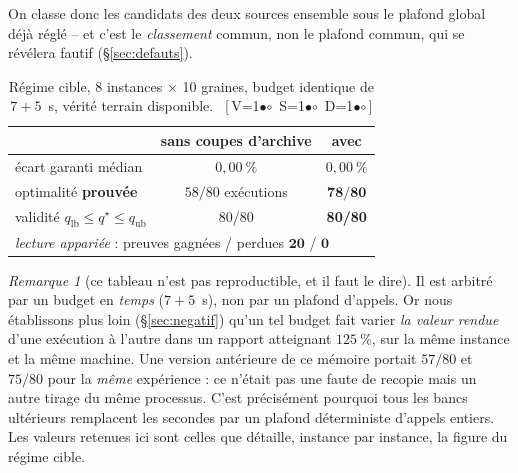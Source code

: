 \documentclass[11pt,a4paper]{article}
\theoremstyle{plain}
\theoremstyle{remark}
\newtheorem{remark}{Remarque}
\newcommand{\qs}{q^{\star}}
\newcommand{\cfgm}[1]{\ifnum#1=1$\bullet$\else$\circ$\fi}
\newcommand{\conf}[3]{%
  \textsf{\footnotesize[\,V\cfgm{#1}\ S\cfgm{#2}\ D\cfgm{#3}\,]}}
\begin{document}
\noindent
On classe donc les candidats des deux sources ensemble sous le plafond
global déjà réglé -- et c'est le \emph{classement} commun, non le plafond
commun, qui se révélera fautif (§\ref{sec:defauts}).

\begin{table}[H]
\centering
\caption{Régime cible, 8 instances $\times$ 10 graines, budget identique de
$7+5$~s, vérité terrain disponible.\ \conf{0}{0}{0}}
\label{tab:archcut}
\begin{tabular}{lcc}
\toprule
& sans coupes d'archive & avec\\
\midrule
écart garanti médian & $0{,}00\ \%$ & $0{,}00\ \%$\\
optimalité \textbf{prouvée} & $58/80$ exécutions & $\mathbf{78/80}$\\
validité $q_{\text{lb}}\le\qs\le q_{\text{ub}}$ & 80/80 & \textbf{80/80}\\
\midrule
\multicolumn{3}{l}{\emph{lecture appariée} : preuves gagnées / perdues
 $\mathbf{20}$ / $\mathbf{0}$}\\
\bottomrule
\end{tabular}
\end{table}

\begin{remark}[ce tableau n'est pas reproductible, et il faut le dire]
Il est arbitré par un budget en \emph{temps} ($7+5$~s), non par un plafond
d'appels. Or nous établissons plus loin (§\ref{sec:negatif}) qu'un tel
budget fait varier \emph{la valeur rendue} d'une exécution à l'autre dans
un rapport atteignant $125\ \%$, sur la même instance et la même machine.
Une version antérieure de ce mémoire portait $57/80$ et $75/80$ pour la
\emph{même} expérience : ce n'était pas une faute de recopie mais un autre
tirage du même processus. C'est précisément pourquoi tous les bancs
ultérieurs remplacent les secondes par un plafond déterministe d'appels
entiers. Les valeurs retenues ici sont celles que détaille, instance par
instance, la figure du régime cible.
\end{remark}
\end{document}
